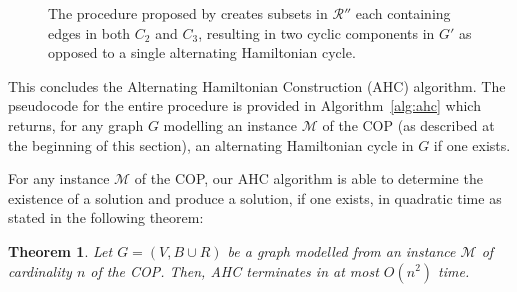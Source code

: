 \documentclass[a4paper,11pt,authoryear]{elsarticle}
\newtheorem{theorem}{Theorem}
\begin{document}
\begin{figure}[h!]
	\centering	
	\begin{subfigure}[h]{0.35\textwidth}
		
		\caption{}
		\label{fig:bcrerror}
	\end{subfigure} \hspace{5mm}
	\begin{subfigure}[h]{0.25\textwidth}
		
		\caption{}
		\label{fig:mpsconnecterror}
	\end{subfigure} \hspace{5mm}
	\begin{subfigure}[h]{0.25\textwidth}
		
		\caption{}
		\label{fig:mpscycleerror}
	\end{subfigure}
	\caption{The procedure proposed by \cite{becker2010} creates subsets in $\mathcal{R}''$ each containing edges in both $C_2$ and $C_3$, resulting in two cyclic components in $G'$ as opposed to a single alternating Hamiltonian cycle.}	
	\label{fig:overlaperror}
\end{figure}


This concludes the Alternating Hamiltonian Construction (AHC) algorithm. The pseudocode for the entire procedure is provided in Algorithm~\ref{alg:ahc} which returns, for any graph $G$ modelling an instance $\mathcal{M}$ of the COP (as described at the beginning of this section), an alternating Hamiltonian cycle in $G$ if one exists.

For any instance $\mathcal{M}$ of the COP, our AHC algorithm is able to determine the existence of a solution and produce a solution, if one exists, in quadratic time as stated in the following theorem:

\begin{theorem}
	Let $G=(V, B \cup R)$ be a graph modelled from an instance $\mathcal{M}$ of cardinality $n$ of the COP. Then, AHC terminates in at most $O(n^2)$ time.
	\label{thm:ahc}
\end{theorem}
\end{document}
